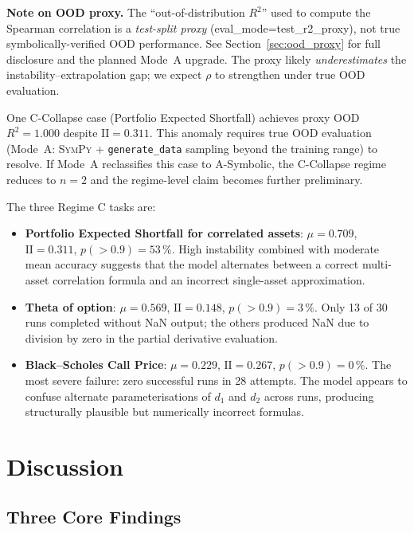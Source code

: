 \documentclass[twoside,11pt]{article}
\newcommand{\Rsq}{R^{2}}
\newcommand{\II}{\mathrm{II}}
\begin{document}
\textbf{Note on OOD proxy.}  The ``out-of-distribution $\Rsq$'' used to compute
the Spearman correlation is a \emph{test-split proxy} (eval\_mode=test\_r2\_proxy),
not true symbolically-verified OOD performance.  See Section~\ref{sec:ood_proxy}
for full disclosure and the planned Mode~A upgrade.  The proxy likely
\emph{underestimates} the instability--extrapolation gap; we expect $\rho$ to
strengthen under true OOD evaluation.

One C-Collapse case (Portfolio Expected Shortfall) achieves proxy OOD $\Rsq=1.000$
despite $\II=0.311$.  This anomaly requires true OOD evaluation (Mode~A:
\textsc{SymPy} + \texttt{generate\_data} sampling beyond the training range) to
resolve.  If Mode~A reclassifies this case to A-Symbolic, the C-Collapse regime
reduces to $n=2$ and the regime-level claim becomes further preliminary.

The three Regime C tasks are:
\begin{itemize}
  \item \textbf{Portfolio Expected Shortfall for correlated assets}:
    $\mu=0.709$, $\II=0.311$, $p(>0.9)=53\,\%$.  High instability combined with
    moderate mean accuracy suggests that the model alternates between a correct
    multi-asset correlation formula and an incorrect single-asset approximation.
  \item \textbf{Theta of option}: $\mu=0.569$, $\II=0.148$, $p(>0.9)=3\,\%$.
    Only 13 of 30 runs completed without NaN output; the others produced NaN due
    to division by zero in the partial derivative evaluation.
  \item \textbf{Black--Scholes Call Price}: $\mu=0.229$, $\II=0.267$, $p(>0.9)=0\,\%$.
    The most severe failure: zero successful runs in 28 attempts.  The model
    appears to confuse alternate parameterisations of $d_1$ and $d_2$ across runs,
    producing structurally plausible but numerically incorrect formulas.
\end{itemize}

\section{Discussion}
\label{sec:discussion}

\subsection{Three Core Findings}\label{subsec:three-core-findings}
\label{sec:disc_findings}
\end{document}
